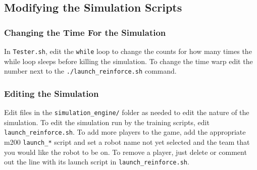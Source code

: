 \documentclass[onecolumn,letterpaper,11pt]{article}
\begin{document}
\subsection{Modifying the Simulation Scripts}
\subsubsection{Changing the Time For the Simulation}
In \texttt{Tester.sh}, edit the \texttt{while} loop to change the counts for how many times the while loop sleeps before killing the simulation. To change the time warp edit the number next to the \texttt{./launch\_reinforce.sh} command. 

\subsubsection{Editing the Simulation}
Edit files in the \texttt{simulation\_engine/} folder as needed to edit the nature of the simulation. To edit the simulation run by the training scripts, edit \texttt{launch\_reinforce.sh}. To add more players to the game, add the appropriate m200 \texttt{launch\_*} script and set a robot name not yet selected and the team that you would like the robot to be on. To remove a player, just delete or comment out the line with its launch script in \texttt{launch\_reinforce.sh}. 
\end{document}
